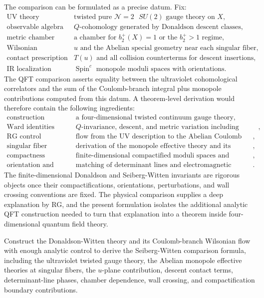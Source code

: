 The comparison can be formulated as a precise datum.  Fix:
\[
\begin{array}{ll}
  \text{UV theory} &
  \text{twisted pure }\mathcal N=2\text{ }SU(2)\text{ gauge theory on }X,\\[1mm]
  \text{observable algebra} &
  Q\text{-cohomology generated by Donaldson descent classes},\\[1mm]
  \text{metric chamber} &
  \text{a chamber for }b_2^+(X)=1\text{ or the }b_2^+>1\text{ regime},\\[1mm]
  \text{Wilsonian coordinate} &
  u\text{ and the Abelian special geometry near each singular fiber},\\[1mm]
  \text{contact prescription} &
  T(u)\text{ and all collision counterterms for descent insertions},\\[1mm]
  \text{IR localization} &
  \operatorname{Spin}^c\text{ monopole moduli spaces with orientations}.
\end{array}
\]
The QFT comparison asserts equality between the ultraviolet cohomological
correlators and the sum of the Coulomb-branch integral plus monopole
contributions computed from this datum.  A theorem-level derivation would
therefore contain the following ingredients:
\[
\begin{array}{ll}
  \text{construction} &
  \text{a four-dimensional twisted continuum gauge theory},\\[1mm]
  \text{Ward identities} &
  Q\text{-invariance, descent, and metric variation including contacts},\\[1mm]
  \text{RG control} &
  \text{flow from the UV description to the Abelian Coulomb chart},\\[1mm]
  \text{singular fiber analysis} &
  \text{derivation of the monopole effective theory and its measure},\\[1mm]
  \text{compactness} &
  \text{finite-dimensional compactified moduli spaces and boundary terms},\\[1mm]
  \text{orientation and phases} &
  \text{matching of determinant lines and electromagnetic duality phases}.
\end{array}
\]
The finite-dimensional Donaldson and Seiberg-Witten invariants are rigorous
objects once their compactifications, orientations, perturbations, and wall
crossing conventions are fixed.  The physical comparison supplies a deep
explanation by RG, and the present formulation isolates the additional
analytic QFT construction needed to turn that explanation into a theorem
inside four-dimensional quantum field theory.

\begin{openproblem}
\label{op:donaldson-seiberg-witten-qft-comparison}
Construct the Donaldson-Witten theory and its Coulomb-branch Wilsonian flow
with enough analytic control to derive the Seiberg-Witten comparison formula,
including the ultraviolet twisted gauge theory, the Abelian monopole
effective theories at singular fibers, the \(u\)-plane contribution, descent
contact terms, determinant-line phases, chamber dependence, wall crossing,
and compactification boundary contributions.
\end{openproblem}
